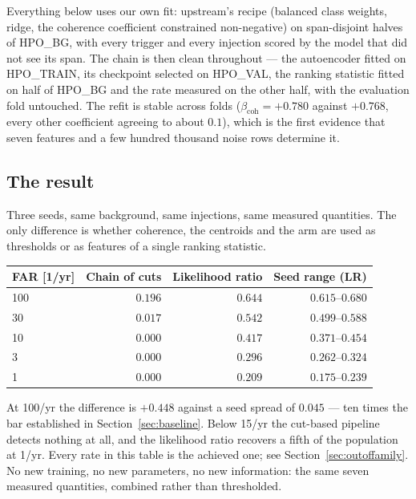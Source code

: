 \documentclass[11pt]{article}
\begin{document}
Everything below uses our own fit: upstream's recipe (balanced class weights, ridge, the
coherence coefficient constrained non-negative) on span-disjoint halves of HPO\_BG, with
every trigger and every injection scored by the model that did not see its span. The
chain is then clean throughout --- the autoencoder fitted on HPO\_TRAIN, its checkpoint
selected on HPO\_VAL, the ranking statistic fitted on half of HPO\_BG and the rate
measured on the other half, with the evaluation fold untouched. The refit is stable
across folds ($\beta_\mathrm{coh} = +0.780$ against $+0.768$, every other coefficient
agreeing to about $0.1$), which is the first evidence that seven features and a few
hundred thousand noise rows determine it.

\subsection*{The result}

Three seeds, same background, same injections, same measured quantities. The only
difference is whether coherence, the centroids and the arm are used as thresholds or as
features of a single ranking statistic.

\begin{center}
\begin{tabular}{lrrr}
\toprule
FAR [1/yr] & Chain of cuts & Likelihood ratio & Seed range (LR) \\
\midrule
100 & $0.196$ & $\mathbf{0.644}$ & $0.615$--$0.680$ \\
30  & $0.017$ & $\mathbf{0.542}$ & $0.499$--$0.588$ \\
10  & $0.000$ & $\mathbf{0.417}$ & $0.371$--$0.454$ \\
3   & $0.000$ & $\mathbf{0.296}$ & $0.262$--$0.324$ \\
1   & $0.000$ & $\mathbf{0.209}$ & $0.175$--$0.239$ \\
\bottomrule
\end{tabular}
\end{center}

At 100/yr the difference is $+0.448$ against a seed spread of $0.045$ --- ten times the
bar established in Section~\ref{sec:baseline}. Below 15/yr the cut-based pipeline detects
nothing at all, and the likelihood ratio recovers a fifth of the population at 1/yr. Every rate in
this table is the achieved one; see Section~\ref{sec:outoffamily}. No
new training, no new parameters, no new information: the same seven measured quantities,
combined rather than thresholded.
\end{document}
